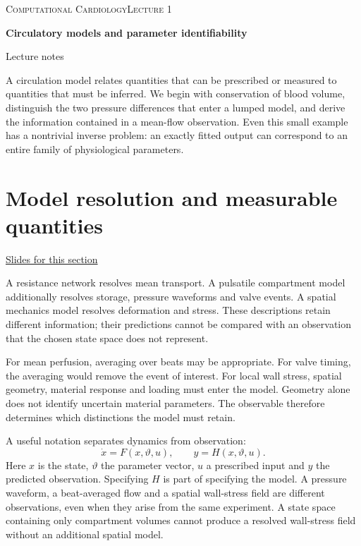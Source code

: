 \documentclass[11pt,letterpaper]{article}
\theoremstyle{definition}\newtheorem{definition}{Definition}\newtheorem{example}{Example}
\numberwithin{equation}{section}
\begin{document}
{\small\scshape Computational Cardiology\hfill Lecture 1}\par\medskip
{\raggedright{}\LARGE\bfseries\color{ink} Circulatory models and parameter identifiability\par}\medskip
{\small Lecture notes}\par\bigskip
A circulation model relates quantities that can be prescribed or measured to quantities that must be inferred. We begin with conservation of blood volume, distinguish the two pressure differences that enter a lumped model, and derive the information contained in a mean-flow observation. Even this small example has a nontrivial inverse problem: an exactly fitted output can correspond to an entire family of physiological parameters.

\section{Model resolution and measurable quantities}
\hypertarget{note-model-resolution-and-measurable-quantities}{}\label{note:model-resolution-and-measurable-quantities}
{\small \href{slides.html\#frame=states-and-observations\&step=1}{Slides for this section}}\par
A resistance network resolves mean transport. A pulsatile compartment model additionally resolves storage, pressure waveforms and valve events. A spatial mechanics model resolves deformation and stress. These descriptions retain different information; their predictions cannot be compared with an observation that the chosen state space does not represent.

For mean perfusion, averaging over beats may be appropriate. For valve timing, the averaging would remove the event of interest. For local wall stress, spatial geometry, material response and loading must enter the model. Geometry alone does not identify uncertain material parameters. The observable therefore determines which distinctions the model must retain.

A useful notation separates dynamics from observation:
\[
 \dot x=F(x,\vartheta,u),\qquad y=H(x,\vartheta,u).
\]
Here $x$ is the state, $\vartheta$ the parameter vector, $u$ a prescribed input and $y$ the predicted observation. Specifying $H$ is part of specifying the model. A pressure waveform, a beat-averaged flow and a spatial wall-stress field are different observations, even when they arise from the same experiment. A state space containing only compartment volumes cannot produce a resolved wall-stress field without an additional spatial model.
\end{document}
